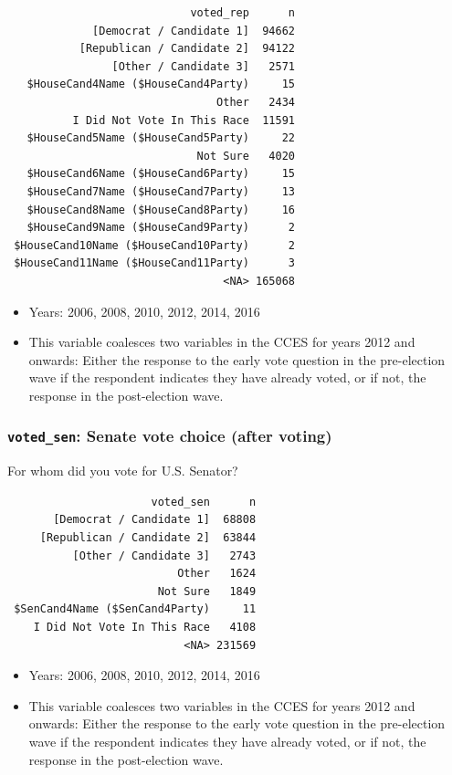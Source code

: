 \documentclass[10pt,article,oneside]{memoir}
\theoremstyle{definition}
\begin{document}
\begin{verbatim}
                            voted_rep      n
             [Democrat / Candidate 1]  94662
           [Republican / Candidate 2]  94122
                [Other / Candidate 3]   2571
   $HouseCand4Name ($HouseCand4Party)     15
                                Other   2434
          I Did Not Vote In This Race  11591
   $HouseCand5Name ($HouseCand5Party)     22
                             Not Sure   4020
   $HouseCand6Name ($HouseCand6Party)     15
   $HouseCand7Name ($HouseCand7Party)     13
   $HouseCand8Name ($HouseCand8Party)     16
   $HouseCand9Name ($HouseCand9Party)      2
 $HouseCand10Name ($HouseCand10Party)      2
 $HouseCand11Name ($HouseCand11Party)      3
                                 <NA> 165068
\end{verbatim}

\begin{itemize}
\tightlist
\item
  Years: 2006, 2008, 2010, 2012, 2014, 2016
\item
  This variable coalesces two variables in the CCES for years 2012 and
  onwards: Either the response to the early vote question in the
  pre-election wave if the respondent indicates they have already voted,
  or if not, the response in the post-election wave.
\end{itemize}

\subsubsection{\texorpdfstring{\texttt{voted\_sen}: Senate vote choice
(after
voting)}{voted\_sen: Senate vote choice (after voting)}}\label{voted_sen-senate-vote-choice-after-voting}

For whom did you vote for U.S. Senator?

\begin{verbatim}
                      voted_sen      n
       [Democrat / Candidate 1]  68808
     [Republican / Candidate 2]  63844
          [Other / Candidate 3]   2743
                          Other   1624
                       Not Sure   1849
 $SenCand4Name ($SenCand4Party)     11
    I Did Not Vote In This Race   4108
                           <NA> 231569
\end{verbatim}

\begin{itemize}
\tightlist
\item
  Years: 2006, 2008, 2010, 2012, 2014, 2016
\item
  This variable coalesces two variables in the CCES for years 2012 and
  onwards: Either the response to the early vote question in the
  pre-election wave if the respondent indicates they have already voted,
  or if not, the response in the post-election wave.
\end{itemize}
\end{document}
